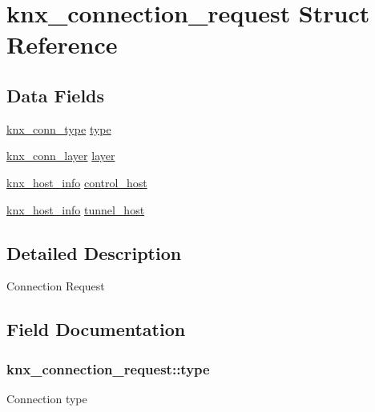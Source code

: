\hypertarget{structknx__connection__request}{}\section{knx\+\_\+connection\+\_\+request Struct Reference}
\label{structknx__connection__request}
\subsection*{Data Fields}
\begin{DoxyCompactItemize}
\item 
\hyperlink{connreq_8h_a5730705958fac25b3fa39e2fc496d5fd}{knx\+\_\+conn\+\_\+type} \hyperlink{structknx__connection__request_a20cdb09f373b109aa8f8caa70006fe8b}{type}
\item 
\hyperlink{connreq_8h_a4ce4b42187bab375d768b5ff144391e2}{knx\+\_\+conn\+\_\+layer} \hyperlink{structknx__connection__request_a9befd4f8f8ba20eb5aaf60cb30c4d2c4}{layer}
\item 
\hyperlink{structknx__host__info}{knx\+\_\+host\+\_\+info} \hyperlink{structknx__connection__request_a47d011996e039bb86e9b298b30df9c89}{control\+\_\+host}
\item 
\hyperlink{structknx__host__info}{knx\+\_\+host\+\_\+info} \hyperlink{structknx__connection__request_a230af058a23d1dbce20c689687c3033d}{tunnel\+\_\+host}
\end{DoxyCompactItemize}


\subsection{Detailed Description}
Connection Request 

\subsection{Field Documentation}
\subsubsection[{\texorpdfstring{type}{type}}]{ knx\+\_\+connection\+\_\+request\+::type}\hypertarget{structknx__connection__request_a20cdb09f373b109aa8f8caa70006fe8b}{}\label{structknx__connection__request_a20cdb09f373b109aa8f8caa70006fe8b}
Connection type 
